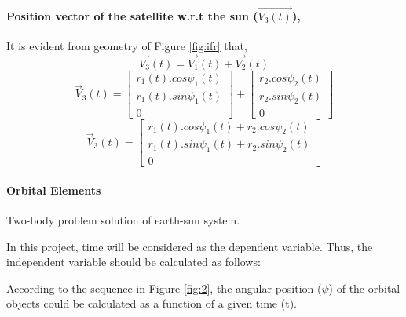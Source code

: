 \documentclass[11pt]{article}
\begin{document}
\paragraph{Position vector of the satellite w.r.t the sun ($\vec{V_3(t)}$),}

It is evident from geometry of Figure \ref{fig:ifr} that,
\begin{equation}
    \vec{V_3}(t) = \vec{V_1}(t) + \vec{V_2}(t)
\end{equation}
\begin{equation}
    \vec{V}_3(t)  = 
            \begin{bmatrix}
            r_1(t) . cos{\psi_1(t)}  \\
            r_1(t) . sin{\psi_1(t)} \\
             0             
            \end{bmatrix} 
            +
            \begin{bmatrix}
            r_2 . cos{\psi_2(t)}  \\
            r_2 . sin{\psi_2(t)} \\
             0             
            \end{bmatrix}  
\end{equation}
\begin{equation}
    \vec{V}_3(t)  =  
            \begin{bmatrix}
            r_1(t) . cos{\psi_1(t)} +r_2 . cos{\psi_2(t)}  \\
            r_1(t) . sin{\psi_1(t)} +r_2 . sin{\psi_2(t)} \\
             0                                
            \end{bmatrix} 
\end{equation}


\paragraph{Orbital Elements}


Two-body problem solution of earth-sun system\cite{fortescue2011spacecraft}.
 

In this project, time will be considered as the dependent variable. Thus, the independent variable should be calculated as follows:





According to the sequence in Figure \ref{fig:2}, the angular position ($\psi$) of the orbital objects could be calculated as a function of a given time (t).
\end{document}
